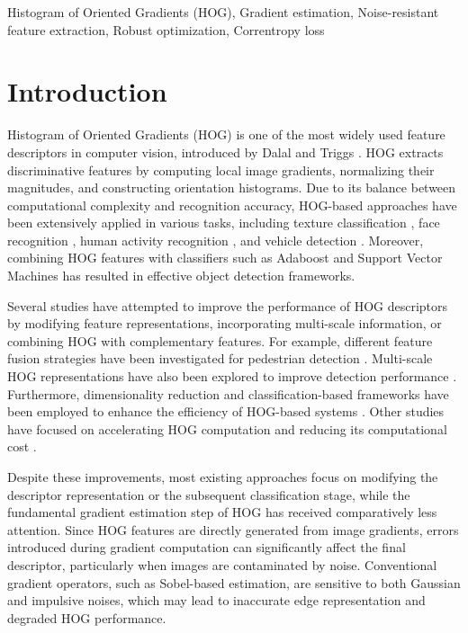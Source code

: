 \documentclass{elsarticle}
\begin{document}
\begin{frontmatter}
\begin{abstract}
\end{abstract}
\begin{keyword}
	Histogram of Oriented Gradients (HOG), 
	Gradient estimation, 
	Noise-resistant feature extraction, 
	Robust optimization, 
	Correntropy loss
\end{keyword}
\end{frontmatter}
\linenumbers
\section{Introduction}

Histogram of Oriented Gradients (HOG) is one of the most widely used feature descriptors in computer vision, introduced by Dalal and Triggs \cite{H1}. HOG extracts discriminative features by computing local image gradients, normalizing their magnitudes, and constructing orientation histograms. Due to its balance between computational complexity and recognition accuracy, HOG-based approaches have been extensively applied in various tasks, including texture classification \cite{H2}, face recognition \cite{H3,H4}, human activity recognition \cite{H6}, and vehicle detection \cite{H7}. Moreover, combining HOG features with classifiers such as Adaboost \cite{H8} and Support Vector Machines \cite{H9,H10} has resulted in effective object detection frameworks.

Several studies have attempted to improve the performance of HOG descriptors by modifying feature representations, incorporating multi-scale information, or combining HOG with complementary features. For example, different feature fusion strategies have been investigated for pedestrian detection \cite{H23,H24,H25,H26,H27}. Multi-scale HOG representations have also been explored to improve detection performance \cite{H16,H17}. Furthermore, dimensionality reduction and classification-based frameworks have been employed to enhance the efficiency of HOG-based systems \cite{H18,H19}. Other studies have focused on accelerating HOG computation and reducing its computational cost \cite{H13,H14,H15,H22}.

Despite these improvements, most existing approaches focus on modifying the descriptor representation or the subsequent classification stage, while the fundamental gradient estimation step of HOG has received comparatively less attention. Since HOG features are directly generated from image gradients, errors introduced during gradient computation can significantly affect the final descriptor, particularly when images are contaminated by noise. Conventional gradient operators, such as Sobel-based estimation, are sensitive to both Gaussian and impulsive noises, which may lead to inaccurate edge representation and degraded HOG performance.
\end{document}
